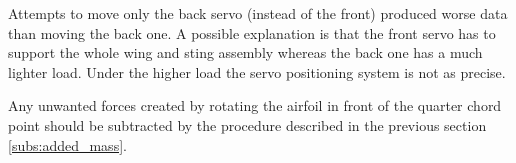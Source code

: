 \par Attempts to move only the back servo (instead of the front) produced worse data than moving the back one.
A possible explanation is that the front servo has to support the whole wing and sting assembly whereas the back one has a much lighter load.
Under the higher load the servo positioning system is not as precise.

\par Any unwanted forces created by rotating the airfoil in front of the quarter chord point should be subtracted by the procedure described in the previous section \ref{subs:added_mass}.
